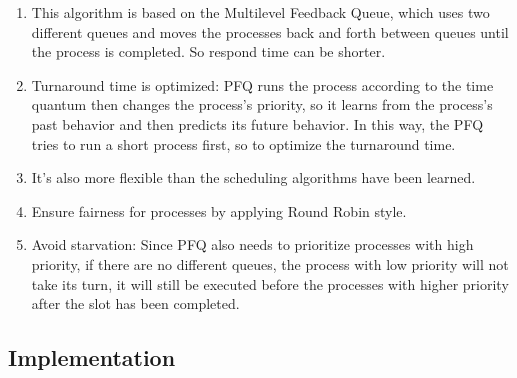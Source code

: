 \documentclass[13pt,a4paper]{article}
\begin{document}
			\begin{enumerate}[-]
				\item This algorithm is based on the Multilevel Feedback Queue, which uses two different queues and moves the processes back and forth between queues until the process is completed. So respond time can be shorter.
				\item Turnaround time is optimized: PFQ runs the process according to the time quantum then changes the process's priority, so it learns from the process's past behavior and then predicts its future behavior. In this way, the PFQ tries to run a short process first, so to optimize the turnaround time.
				\item It's also more flexible than the scheduling algorithms have been learned.
				\item Ensure fairness for processes by applying Round Robin style.
				\item Avoid starvation: Since PFQ also needs to prioritize processes with high priority, if there are no different queues, the process with low priority will not take its turn, it will still be executed before the processes with higher priority after the slot has been completed.
			\end{enumerate}
		\subsection{Implementation}
\end{document}
